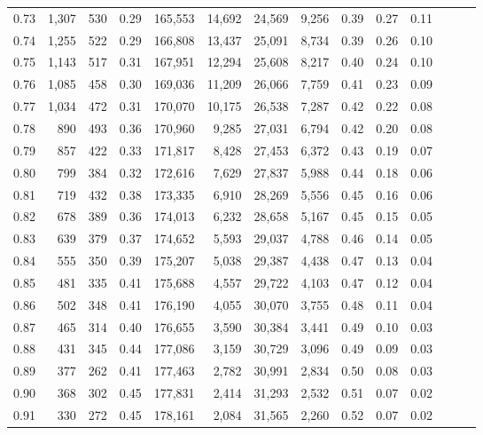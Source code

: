 \begin{tabular}{rrrrrrrrrrrrrr}
0.73 &  1,307 &  530 &  0.29 &  165,553 &   14,692 &  24,569 &   9,256 &  0.39 &  0.27 &      0.11 \\
0.74 &  1,255 &  522 &  0.29 &  166,808 &   13,437 &  25,091 &   8,734 &  0.39 &  0.26 &      0.10 \\
0.75 &  1,143 &  517 &  0.31 &  167,951 &   12,294 &  25,608 &   8,217 &  0.40 &  0.24 &      0.10 \\
0.76 &  1,085 &  458 &  0.30 &  169,036 &   11,209 &  26,066 &   7,759 &  0.41 &  0.23 &      0.09 \\
0.77 &  1,034 &  472 &  0.31 &  170,070 &   10,175 &  26,538 &   7,287 &  0.42 &  0.22 &      0.08 \\
0.78 &    890 &  493 &  0.36 &  170,960 &    9,285 &  27,031 &   6,794 &  0.42 &  0.20 &      0.08 \\
0.79 &    857 &  422 &  0.33 &  171,817 &    8,428 &  27,453 &   6,372 &  0.43 &  0.19 &      0.07 \\
0.80 &    799 &  384 &  0.32 &  172,616 &    7,629 &  27,837 &   5,988 &  0.44 &  0.18 &      0.06 \\
0.81 &    719 &  432 &  0.38 &  173,335 &    6,910 &  28,269 &   5,556 &  0.45 &  0.16 &      0.06 \\
0.82 &    678 &  389 &  0.36 &  174,013 &    6,232 &  28,658 &   5,167 &  0.45 &  0.15 &      0.05 \\
0.83 &    639 &  379 &  0.37 &  174,652 &    5,593 &  29,037 &   4,788 &  0.46 &  0.14 &      0.05 \\
0.84 &    555 &  350 &  0.39 &  175,207 &    5,038 &  29,387 &   4,438 &  0.47 &  0.13 &      0.04 \\
0.85 &    481 &  335 &  0.41 &  175,688 &    4,557 &  29,722 &   4,103 &  0.47 &  0.12 &      0.04 \\
0.86 &    502 &  348 &  0.41 &  176,190 &    4,055 &  30,070 &   3,755 &  0.48 &  0.11 &      0.04 \\
0.87 &    465 &  314 &  0.40 &  176,655 &    3,590 &  30,384 &   3,441 &  0.49 &  0.10 &      0.03 \\
0.88 &    431 &  345 &  0.44 &  177,086 &    3,159 &  30,729 &   3,096 &  0.49 &  0.09 &      0.03 \\
0.89 &    377 &  262 &  0.41 &  177,463 &    2,782 &  30,991 &   2,834 &  0.50 &  0.08 &      0.03 \\
0.90 &    368 &  302 &  0.45 &  177,831 &    2,414 &  31,293 &   2,532 &  0.51 &  0.07 &      0.02 \\
0.91 &    330 &  272 &  0.45 &  178,161 &    2,084 &  31,565 &   2,260 &  0.52 &  0.07 &      0.02 \\

\end{tabular}
